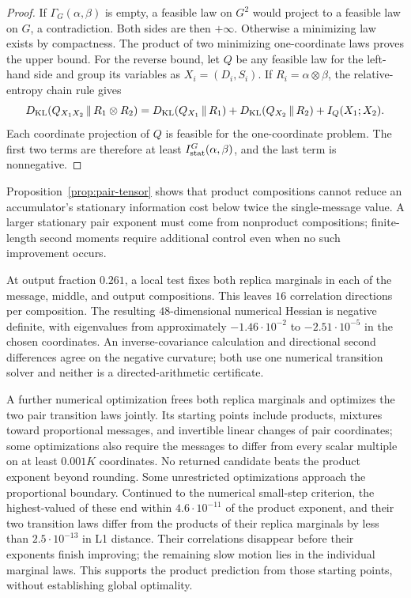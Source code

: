 \begin{proof}
If $\Gamma_G(\alpha,\beta)$ is empty, a feasible law on $G^2$ would
project to a feasible law on $G$, a contradiction. Both sides are then
$+\infty$. Otherwise a minimizing law exists by compactness.
The product of two minimizing one-coordinate laws proves the upper bound.
For the reverse bound, let $Q$ be any feasible law for the left-hand side
and group its variables as $X_i=(D_i,S_i)$.  If
$R_i=\alpha\otimes\beta$, the relative-entropy chain rule gives
\[
 D_{\rm KL}(Q_{X_1X_2}\,\|\,R_1\otimes R_2)
 =D_{\rm KL}(Q_{X_1}\,\|\,R_1)
  +D_{\rm KL}(Q_{X_2}\,\|\,R_2)
  +I_Q(X_1;X_2).
\]
Each coordinate projection of $Q$ is feasible for the one-coordinate
problem.  The first two terms are therefore at least
$I_{\rm stat}^G(\alpha,\beta)$, and the last term is nonnegative.
\end{proof}

Proposition~\ref{prop:pair-tensor} shows that product compositions cannot
reduce an accumulator's stationary information cost below twice the
single-message value.  A larger stationary pair exponent must come from
nonproduct compositions; finite-length second moments require additional
control even when no such improvement occurs.

At output fraction $0.261$, a local test fixes both replica marginals in
each of the message, middle, and output compositions.  This leaves $16$
correlation directions per composition.  The resulting $48$-dimensional
numerical Hessian is negative definite, with eigenvalues from approximately
$-1.46\cdot10^{-2}$ to $-2.51\cdot10^{-5}$ in the chosen coordinates.
An inverse-covariance calculation and directional second differences agree
on the negative curvature; both use one numerical transition solver and
neither is a directed-arithmetic certificate.

A further numerical optimization frees both replica marginals and optimizes
the two pair transition laws jointly.  Its starting points include products,
mixtures toward proportional messages, and invertible linear changes of pair
coordinates; some optimizations also require the messages to differ from
every scalar multiple on at least $0.001K$ coordinates.  No returned
candidate beats the product exponent beyond rounding.  Some unrestricted
optimizations approach the proportional boundary.  Continued to the
numerical small-step criterion, the highest-valued of these end within
$4.6\cdot10^{-11}$ of the product exponent, and their two transition laws
differ from the products of their replica marginals by less than
$2.5\cdot10^{-13}$ in L1 distance.  Their correlations disappear before their
exponents finish improving; the remaining slow motion lies in the individual
marginal laws.  This supports the product prediction from those starting
points, without establishing global optimality.

